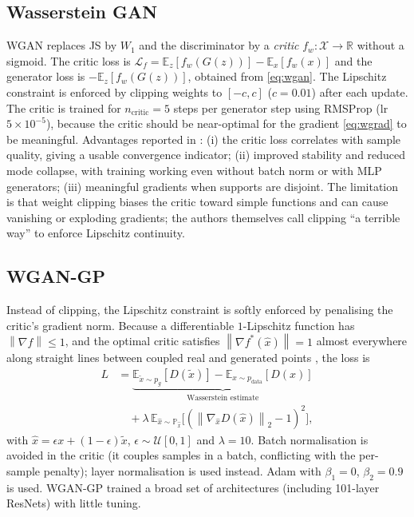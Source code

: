 \documentclass[conference]{IEEEtran}
\newcommand{\E}{\mathbb{E}}
\newcommand{\pdata}{p_{\mathrm{data}}}
\newcommand{\pg}{p_{g}}
\newcommand{\norm}[1]{\left\lVert #1 \right\rVert}
\theoremstyle{plain}
\theoremstyle{definition}
\begin{document}
\subsection{Wasserstein GAN \cite{arjovsky2017wgan}}
WGAN replaces JS by $W_1$ and the discriminator by a \emph{critic} $f_w:\mathcal{X}\to\mathbb{R}$ without a sigmoid. The critic loss is $\mathcal{L}_{f}=\E_{z}[f_w(G(z))]-\E_x[f_w(x)]$ and the generator loss is $-\E_z[f_w(G(z))]$, obtained from \eqref{eq:wgan}. The Lipschitz constraint is enforced by clipping weights to $[-c,c]$ ($c=0.01$) after each update. The critic is trained for $n_{\text{critic}}=5$ steps per generator step using RMSProp (lr $5\times10^{-5}$), because the critic should be near-optimal for the gradient \eqref{eq:wgrad} to be meaningful. Advantages reported in \cite{arjovsky2017wgan}: (i) the critic loss correlates with sample quality, giving a usable convergence indicator; (ii) improved stability and reduced mode collapse, with training working even without batch norm or with MLP generators; (iii) meaningful gradients when supports are disjoint. The limitation is that weight clipping biases the critic toward simple functions and can cause vanishing or exploding gradients; the authors themselves call clipping ``a terrible way'' to enforce Lipschitz continuity.

\subsection{WGAN-GP \cite{gulrajani2017wgangp}}
Instead of clipping, the Lipschitz constraint is softly enforced by penalising the critic's gradient norm. Because a differentiable $1$-Lipschitz function has $\norm{\nabla f}\le1$, and the optimal critic satisfies $\norm{\nabla f^*(\hat x)}=1$ almost everywhere along straight lines between coupled real and generated points \cite{gulrajani2017wgangp}, the loss is
\begin{align}
L&=\underbrace{\E_{\tilde x\sim\pg}[D(\tilde x)]-\E_{x\sim\pdata}[D(x)]}_{\text{Wasserstein estimate}}\nonumber\\
&\quad+\lambda\,\E_{\hat x\sim\mathbb{P}_{\hat x}}\big[(\norm{\nabla_{\hat x}D(\hat x)}_2-1)^2\big],
\label{eq:wgangp}
\end{align}
with $\hat x=\epsilon x+(1-\epsilon)\tilde x$, $\epsilon\sim\mathcal{U}[0,1]$ and $\lambda=10$. Batch normalisation is avoided in the critic (it couples samples in a batch, conflicting with the per-sample penalty); layer normalisation is used instead. Adam with $\beta_1=0$, $\beta_2=0.9$ is used. WGAN-GP trained a broad set of architectures (including 101-layer ResNets) with little tuning.
\end{document}

